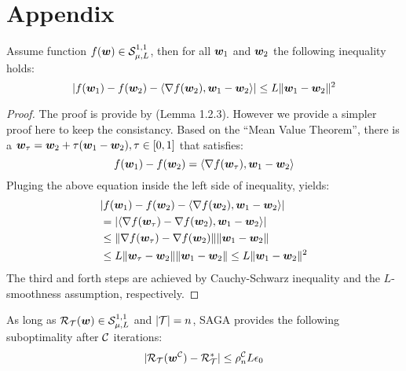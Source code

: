 \newpage
\appendix
\section{Appendix}
\label{App:Appendix}

\begin{lemma}
	Assume function $f(\bm{w}) \in {\cal S}_{\mu,L}^{1,1}$, then for all $\bm{w}_1$ and $\bm{w}_2$ the
	following inequality holds: 
    \begin{equation*}
    	| f(\bm{w}_1) - f(\bm{w}_2) - \langle \nabla f(\bm{w}_2), \bm{w}_1 - \bm{w}_2 \rangle | \leq
    	L \| \bm{w}_1 - \bm{w}_2 \| ^2 
    \end{equation*}
\end{lemma}

\begin{proof}
	The proof is provide by \cite{nesterov2004introductory} (Lemma 1.2.3). However
	we provide a simpler proof here to keep the consistancy. Based on the ``Mean
	Value Theorem'', there is a $\bm{w}_{\tau} = \bm{w}_2 + \tau(\bm{w}_1-\bm{w}_2), \tau \in [0,1]$
	that satisfies:
	\begin{equation*}
		f(\bm{w}_1) - f(\bm{w}_2) = \langle \nabla f(\bm{w}_{\tau}), \bm{w}_1 - \bm{w}_2 \rangle
	\end{equation*}
	Pluging the above equation inside the left side of inequality, yields: 
	\begin{eqnarray*}
		& | f(\bm{w}_1) - f(\bm{w}_2) - \langle \nabla f(\bm{w}_2), \bm{w}_1 - \bm{w}_2 \rangle | \\ 
		& = | \langle \nabla f(\bm{w}_{\tau}) - \nabla f(\bm{w}_2), \bm{w}_1 - \bm{w}_2 \rangle| \\ 
		& \leq \|  \nabla f(\bm{w}_{\tau}) - \nabla f(\bm{w}_2) \| \|\bm{w}_1 - \bm{w}_2 \|
		\\
		& \leq L \|  \bm{w}_{\tau} - \bm{w}_2 \| \|\bm{w}_1 - \bm{w}_2 \| \leq L \|\bm{w}_1 -
		\bm{w}_2 \|^2 \\
	\end{eqnarray*}
	The third and forth steps are achieved by Cauchy-Schwarz inequality and the
	$L$-smoothness assumption, respectively. 
\end{proof}
\begin{lemma} \label{lemma:saga_convergence}
	As long as ${\cal R}_{{\cal T}}(\bm{w}) \in {\cal S}_{\mu,L}^{1,1}$ and $|{\cal T}| = n$, SAGA provides the
	following suboptimality after ${\cal C}$ iterations: 
	\begin{equation*}
		|{\cal R}_{{\cal T}}(\bm{w}^{{\cal C}}) - {\cal R}_{{\cal T}}^* | \leq \rho_n^{{\cal C}} L \epsilon_0
	\end{equation*}
\end{lemma}
